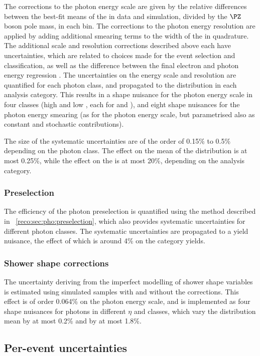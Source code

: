 The corrections to the photon energy scale are given by the relative differences between the best-fit means of the \CB in data and simulation, divided by the $\PZ$ boson pole mass, in each bin. The corrections to the photon energy resolution are applied by adding additional smearing terms to the width of the \CB in quadrature. The additional scale and resolution corrections described above each have uncertainties, which are related to choices made for the \Zee event selection and classification, as well as the difference between the final electron and photon energy regression \BDT\s. The uncertainties on the energy scale and resolution are quantified for each photon class, and propagated to the \mgg distribution in each analysis category. This results in a shape nuisance for the photon energy scale in four classes (high and low \RNINE, each for \EB and \EE), and eight shape nuisances for the photon energy smearing (as for the photon energy scale, but parametrised also as constant and stochastic contributions). 

The size of the systematic uncertainties are of the order of 0.15\% to 0.5\% depending on the photon class. The effect on the mean of the \mgg distribution is at most 0.25\%, while the effect on the \effSigma is at most 20\%, depending on the analysis category.

\subsubsection{Preselection}
The efficiency of the photon preselection is quantified using the \TagAndProbe method described in \Sec~\ref{reco:sec:pho:preselection}, which also provides systematic uncertainties for different photon classes. The systematic uncertainties are propagated to a yield nuisance,
the effect of which is around 4\% on the category yields.

\subsubsection{Shower shape corrections}
The uncertainty deriving from the imperfect modelling of shower shape variables is estimated using simulated samples with and without the corrections. This effect is of order 0.064\% on the photon energy scale, and is implemented as four shape nuisances for photons in different $\eta$ and \RNINE classes, which vary the \mgg distribution mean by at most 0.2\% and \effSigma by at most 1.8\%.

\subsection{Per-event uncertainties}

